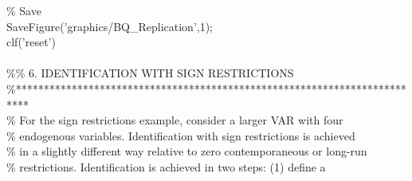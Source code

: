 \hspace{1mm}\hspace{5mm} \hspace{5mm} \textcolor{matlabgreen}{\% Save }\\ 
\hspace{1mm}\hspace{5mm} \hspace{5mm} SaveFigure(\textcolor{matlabpurple}{'graphics/BQ\_Replication'},1); \\ 
\hspace{1mm}\hspace{5mm} \hspace{5mm} clf(\textcolor{matlabpurple}{'reset'}) \\ 
\hspace{1mm}\hspace{5mm} \hspace{5mm}  \\ 
\hspace{1mm}\hspace{5mm} \hspace{5mm} \textcolor{matlabgreen}{\%}\textcolor{matlabgreen}{\% 6. IDENTIFICATION WITH SIGN RESTRICTIONS }\\ 
\hspace{1mm}\hspace{5mm} \hspace{5mm} \textcolor{matlabgreen}{\%**************************************************************************  }\\ 
\hspace{1mm}\hspace{5mm} \hspace{5mm} \textcolor{matlabgreen}{\% For the sign restrictions example, consider a larger VAR  with four  }\\ 
\hspace{1mm}\hspace{5mm} \hspace{5mm} \textcolor{matlabgreen}{\% endogenous variables. Identification with sign restrictions is achieved  }\\ 
\hspace{1mm}\hspace{5mm} \hspace{5mm} \textcolor{matlabgreen}{\% in a slightly different way relative to zero contemporaneous or long-run  }\\ 
\hspace{1mm}\hspace{5mm} \hspace{5mm} \textcolor{matlabgreen}{\% restrictions. Identification is achieved in two steps: (1) define a  }\\ 
